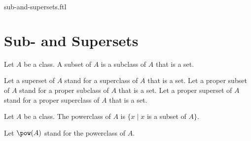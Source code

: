 \documentclass{naproche-library}
\begin{document}
\begin{smodule}{sub-and-supersets.ftl}


  \section*{Sub- and Supersets}

  \begin{definition}[forthel,id=FOUNDATIONS_10_1346889551183872,printid]
    Let $A$ be a class.
    A subset of $A$ is a subclass of $A$ that is a set.

    Let a superset of $A$ stand for a superclass of $A$ that is a set.
    Let a proper subset of $A$ stand for a proper subclass of $A$ that is a set.
    Let a proper superset of $A$ stand for a proper superclass of $A$ that is a set.
  \end{definition}

  \begin{definition}[forthel,id=FOUNDATIONS_10_1448589907722240,printid]
    Let $A$ be a class.
    The powerclass of $A$ is $\{ x \mid x$ is a subset of $A \}$.

    Let $\pow(A)$ stand for the powerclass of $A$.
  \end{definition}
\end{smodule}
\end{document}
